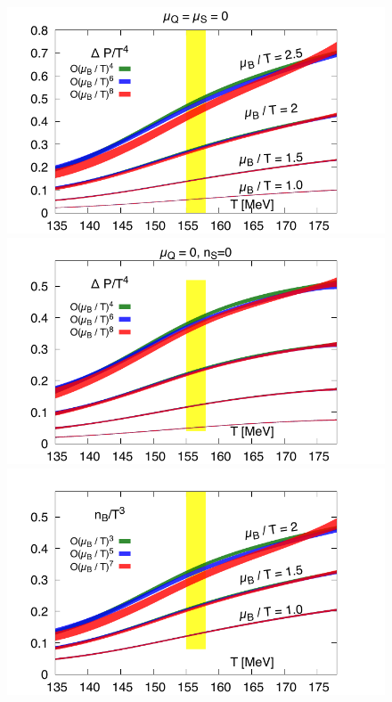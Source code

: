 \documentclass[pdflatex,prd,twocolumn,showpacs,superscriptaddress,nofootinbib]{revtex4-1}
\begin{document}
\begin{figure}[t]
\begin{center}
\includegraphics[scale=0.56]{fig/Temp_BQS000_muB_Order.pdf}
\includegraphics[scale=0.56]{fig/Temp_BQS000_muB_Order_r05.pdf} 
\includegraphics[scale=0.56]{fig/Temp_BQS100_muB_Order.pdf}

\end{center}
\end{figure}
\end{document}
